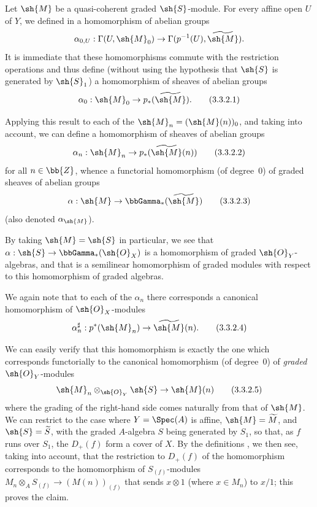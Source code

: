 \begin{env}[3.3.2]
\label{II.3.3.2}
Let $\sh{M}$ be a quasi-coherent graded $\sh{S}$-module.
For every affine open $U$ of $Y$, we defined in  a homomorphism of abelian groups
\[
  \alpha_{0,U} : \Gamma(U,\sh{M}_0) \to \Gamma(p^{-1}(U),\widetilde{\sh{M}}).
\]
It is immediate that these homomorphisms commute with the restriction operations  and thus define (without using the hypothesis that $\sh{S}$ is generated by $\sh{S}_1$) a homomorphism of sheaves of abelian groups
\[
\label{II.3.3.2.1}
  \alpha_0 : \sh{M}_0 \to p_*(\widetilde{\sh{M}}).
\tag{3.3.2.1}
\]

Applying this result to each of the $\sh{M}_n=(\sh{M}(n))_0$, and taking  into account, we can define a homomorphism of sheaves of abelian groups
\[
\label{II.3.3.2.2}
  \alpha_n : \sh{M}_n \to p_*(\widetilde{\sh{M}}(n))
\tag{3.3.2.2}
\]
for all $n\in\bb{Z}$, whence a functorial homomorphism (of degree~$0$) of graded sheaves of abelian groups
\[
\label{II.3.3.2.3}
  \alpha : \sh{M} \to \bbGamma_*(\widetilde{\sh{M}})
\tag{3.3.2.3}
\]
(also denoted $\alpha_{\sh{M}}$).

By taking $\sh{M}=\sh{S}$ in particular, we see that $\alpha:\sh{S}\to\bbGamma_*(\sh{O}_X)$ is a homomorphism of graded $\sh{O}_Y$-algebras, and that  is a semilinear homomorphism of graded modules with respect to this homomorphism of graded algebras.

We again note that to each of the $\alpha_n$ there corresponds  a canonical homomorphism of $\sh{O}_X$-modules
\[
\label{II.3.3.2.4}
  \alpha_n^\sharp : p^*(\sh{M}_n) \to \widetilde{\sh{M}}(n).
\tag{3.3.2.4}
\]

We can easily verify that this homomorphism is exactly the one which corresponds functorially  to the canonical homomorphism (of degree~$0$) of \emph{graded} $\sh{O}_Y$-modules
\[
\label{II.3.3.2.5}
  \sh{M}_n\otimes_{\sh{O}_Y}\sh{S} \to \sh{M}(n)
\tag{3.3.2.5}
\]
where the grading of the right-hand side comes naturally from that of $\sh{M}$.
We can restrict to the case where $Y=\Spec(A)$ is affine, $\sh{M}=\widetilde{M}$, and $\sh{S}=\widetilde{S}$, with the graded $A$-algebra $S$ being generated by $S_1$, so that, as $f$ runs over $S_1$, the $D_+(f)$ form a cover of $X$.
By the definitions , we then see, taking  into account, that the restriction to $D_+(f)$ of the homomorphism  corresponds  to the homomorphism of $S_{(f)}$-modules $M_n\otimes_A S_{(f)}\to(M(n))_{(f)}$ that sends $x\otimes1$ (where $x\in M_n$) to $x/1$;
this proves the claim.
\end{env}

